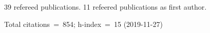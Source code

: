 39 refereed publications. 11 refeered publications as first author.

Total citations~=~854; h-index~=~15 (2019-11-27)